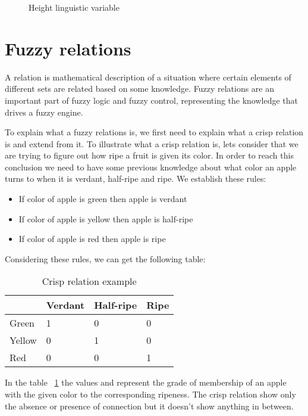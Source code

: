 \begin{figure}[h!]
    \centerline{}
    \caption[Height linguistic variable]{Height linguistic variable}
\end{figure}


\section{Fuzzy relations}

\qquad A relation is mathematical description of a situation where certain elements of different sets are related
based on some knowledge. Fuzzy relations are an important part of fuzzy logic and fuzzy control, representing
the knowledge that drives a fuzzy engine.

\qquad To explain what a fuzzy relations is, we first need to explain what a crisp relation is and extend from
it. To illustrate what a crisp relation is, lets consider that we are trying to figure out how ripe a fruit is
given its color. In order to reach this conclusion we need to have some previous knowledge about what color
an apple turns to when it is verdant, half-ripe and ripe. We establish these rules:
\begin{itemize}
    \item If color of apple is green then apple is verdant
    \item If color of apple is yellow then apple is half-ripe
    \item If color of apple is red then apple is ripe
\end{itemize}

Considering these rules, we can get the following table:
\begin{center}
    \begin{table}[h!]
    \centering
    \begin{tabular}{| l | l | l | l |}
        \hline
        & Verdant & Half-ripe & Ripe \\ \hline
        Green & 1 & 0 & 0 \\ \hline
        Yellow & 0 & 1 & 0 \\ \hline
        Red & 0 & 0 & 1 \\
        \hline
    \end{tabular}
    \caption[Crisp relation example]{Crisp relation example}
    \label{table:crisp_relation}
    \end{table}
\end{center}

\qquad In the table ~\ref{table:crisp_relation} the values  and  represent the grade of
membership of an apple with the given color to the corresponding ripeness. The crisp relation show only
the absence or presence of connection but it doesn't show anything in between.

